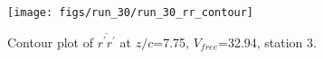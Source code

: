 \begin{figure}[H]
\centering
\texttt{[image: figs/run\_30/run\_30\_rr\_contour]}
\caption{Contour plot of $\overline{r^\prime r^\prime}$ at $z/c$=7.75, $V_{free}$=32.94, station 3.}
\label{fig:run_30_rr_contour}
\end{figure}


